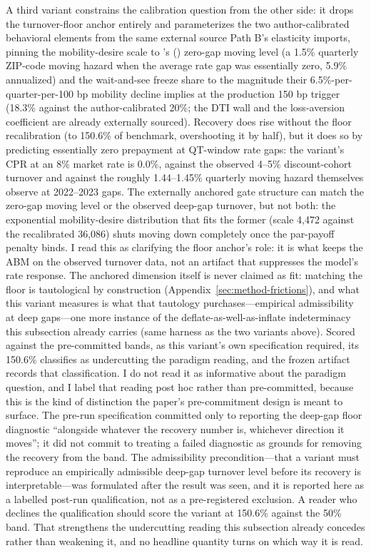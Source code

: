 \documentclass[12pt]{article}
\newcommand{\citepos}[1]{\citeauthor{#1}'s (\citeyear{#1})}
\begin{document}
A third variant constrains the calibration question from the other side: it drops the turnover-floor anchor entirely and parameterizes the two author-calibrated behavioral elements from the same external source Path B's elasticity imports, pinning the mobility-desire scale to \citepos{liebersohn2024} zero-gap moving level (a 1.5\% quarterly ZIP-code moving hazard when the average rate gap was essentially zero, 5.9\% annualized) and the wait-and-see freeze share to the magnitude their 6.5\%-per-quarter-per-100 bp mobility decline implies at the production 150 bp trigger (18.3\% against the author-calibrated 20\%; the DTI wall and the loss-aversion coefficient are already externally sourced). Recovery does rise without the floor recalibration (to 150.6\% of benchmark, overshooting it by half), but it does so by predicting essentially zero prepayment at QT-window rate gaps: the variant's CPR at an 8\% market rate is 0.0\%, against the observed 4--5\% discount-cohort turnover and against the roughly 1.44--1.45\% quarterly moving hazard \citet{liebersohn2024} themselves observe at 2022--2023 gaps. The externally anchored gate structure can match the zero-gap moving level or the observed deep-gap turnover, but not both: the exponential mobility-desire distribution that fits the former (scale 4{,}472 against the recalibrated 36{,}086) shuts moving down completely once the par-payoff penalty binds. I read this as clarifying the floor anchor's role: it is what keeps the ABM on the observed turnover data, not an artifact that suppresses the model's rate response. The anchored dimension itself is never claimed as fit: matching the floor is tautological by construction (Appendix~\ref{sec:method-frictions}), and what this variant measures is what that tautology purchases---empirical admissibility at deep gaps---one more instance of the deflate-as-well-as-inflate indeterminacy this subsection already carries (same harness as the two variants above). Scored against the pre-committed bands, as this variant's own specification required, its 150.6\% classifies as undercutting the paradigm reading, and the frozen artifact records that classification. I do not read it as informative about the paradigm question, and I label that reading post hoc rather than pre-committed, because this is the kind of distinction the paper's pre-commitment design is meant to surface. The pre-run specification committed only to reporting the deep-gap floor diagnostic ``alongside whatever the recovery number is, whichever direction it moves''; it did not commit to treating a failed diagnostic as grounds for removing the recovery from the band. The admissibility precondition---that a variant must reproduce an empirically admissible deep-gap turnover level before its recovery is interpretable---was formulated after the result was seen, and it is reported here as a labelled post-run qualification, not as a pre-registered exclusion. A reader who declines the qualification should score the variant at 150.6\% against the 50\% band. That strengthens the undercutting reading this subsection already concedes rather than weakening it, and no headline quantity turns on which way it is read.
\end{document}
